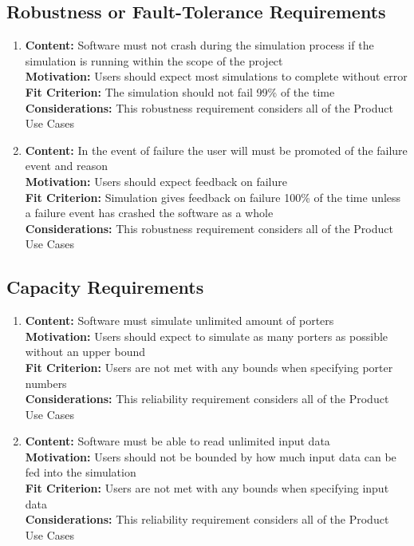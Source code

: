 \documentclass[paper=letter, fontsize=10pt]{scrartcl}
\numberwithin{equation}{section}		%
\numberwithin{figure}{section}			%
\numberwithin{table}{section}				%
\begin{document}
\subsection{Robustness or Fault-Tolerance Requirements}
	\begin{enumerate}
		\item \textbf{Content:} Software must not crash during the simulation process if the simulation is running within the scope of the project
		\\	  \textbf{Motivation:} Users should expect most simulations to complete without error
		\\	  \textbf{Fit Criterion:} The simulation should not fail 99\% of the time
		\\	  \textbf{Considerations:} This robustness requirement considers all of the Product Use Cases
		\item \textbf{Content:} In the event of failure the user will must be promoted of the failure event and reason
		\\	  \textbf{Motivation:} Users should expect feedback on failure
		\\	  \textbf{Fit Criterion:} Simulation gives feedback on failure 100\% of the time unless a failure event has crashed the software as a whole
		\\	  \textbf{Considerations:} This robustness requirement considers all of the Product Use Cases
	\end{enumerate}
\subsection{Capacity Requirements}
\begin{enumerate}
		\item \textbf{Content:} Software must simulate unlimited amount of porters
		\\	  \textbf{Motivation:} Users should expect to simulate as many porters as possible without an upper bound
		\\	  \textbf{Fit Criterion:} Users are not met with any bounds when specifying porter numbers
		\\	  \textbf{Considerations:} This reliability requirement considers all of the Product Use Cases 
		\item \textbf{Content:} Software must be able to read unlimited input data
		\\	  \textbf{Motivation:} Users should not be bounded by how much input data can be fed into the simulation
		\\	  \textbf{Fit Criterion:} Users are not met with any bounds when specifying input data
		\\	  \textbf{Considerations:} This reliability requirement considers all of the Product Use Cases 
	\end{enumerate}
\end{document}
